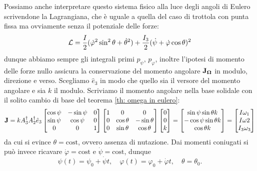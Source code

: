     Possiamo anche interpretare questo sistema fisico alla luce degli angoli di Eulero scrivendone la Lagrangiana, che è uguale a quella del caso di trottola con punta fissa ma ovviamente senza il potenziale delle forze:
    \begin{equation}
        \mathcal{L} = \frac{I}{2}(\dot{\varphi}^2\sin^2\theta+\dot{\theta}^2)+\frac{I_3}{2}(\dot{\psi}+\dot{\varphi}\cos\theta)^2
    \end{equation}
    dunque abbiamo sempre gli integrali primi $p_\psi,\,p_\varphi$, inoltre l'ipotesi di momento delle forze nullo assicura la conservazione del momento angolare $\mathbf{J}_{\boldsymbol{\Omega}}$ in modulo, direzione e verso. Scegliamo $\hat{e}_3$ in modo che quello sia il versore del momento angolare e sia $k$ il modulo. Scriviamo il momento angolare nella base solidale con il solito cambio di base del teorema \ref{th: omega in eulero}:
    \begin{equation}
    \mathbf{J} = kA_3^\dagger A_2^\dagger\hat{e}_3
        \begin{bmatrix}
            \cos\psi &-\sin\psi &0\\
            \sin\psi &  \cos\psi&0\\
            0 & 0 & 1
        \end{bmatrix}\begin{bmatrix}
            1 & 0 & 0\\
            0 & \cos \theta & -\sin\theta \\
            0 & \sin \theta & \cos \theta
        \end{bmatrix}\begin{bmatrix}
            0\\
            0\\
            k
        \end{bmatrix}=\begin{bmatrix}
            \sin\psi \sin \theta k\\
           - \cos\psi\sin\theta k\\
            \cos\theta k
        \end{bmatrix} = \begin{bmatrix}
            I\omega_1\\
            I\omega2\\
            I_3\omega_3
        \end{bmatrix}
        \label{questaDZHANI}
    \end{equation}
    da cui si evince $\theta=\mathrm{cost}$, ovvero assenza di nutazione. Dai momenti coniugati si può invece ricavare $\dot{\varphi}=\mathrm{cost}$ e $\dot{\psi}=\mathrm{cost}$, dunque
    \begin{equation}
        \psi(t) = \psi_0+\dot{\psi}t,\quad\varphi(t) = \varphi_0+\dot{\varphi}t, \quad \theta = \theta_0.
    \end{equation}
